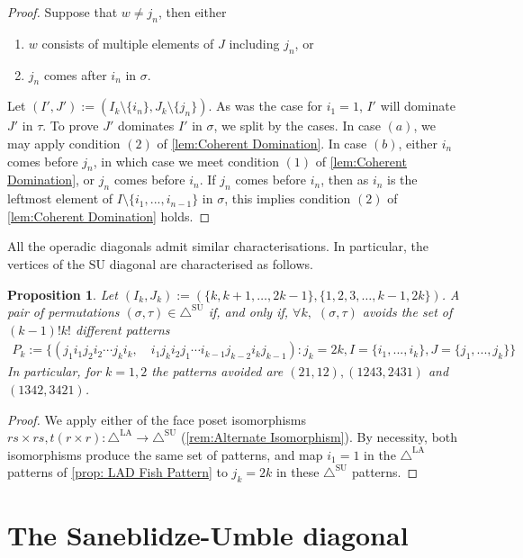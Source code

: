 \documentclass{amsart}
\newtheorem{proposition}[theorem]{Proposition}
\theoremstyle{definition}
\newcommand{\SU}{\mathrm{SU}}
\newcommand{\SUD}{\triangle^{\mathrm{SU}}}
\newcommand{\LAD}{\triangle^{\mathrm{LA}}}
\begin{document}
\begin{proof}
Suppose that $w\neq j_n$, then either
\begin{enumerate}
    \item $w$ consists of multiple elements of $J$ including $j_n$, or
    \item $j_n$ comes after $i_n$ in $\sigma$.
\end{enumerate}
Let $(I',J'):=(I_k\setminus \{i_n\}, J_k \setminus \{j_n\})$.
As was the case for $i_1=1$, $I'$ will dominate $J'$ in $\tau$.
To prove $J'$ dominates $I'$ in $\sigma$, we split by the cases.
In case $(a)$, we may apply condition $(2)$ of \cref{lem:Coherent Domination}.
In case $(b)$, either $i_n$ comes before $j_n$, in which case we meet condition $(1)$ of \cref{lem:Coherent Domination}, or $j_n$ comes before $i_n$.
If $j_n$ comes before $i_n$, then as $i_n$ is the leftmost element of $I\setminus \{i_1,...,i_{n-1} \}$ in $\sigma$, this implies condition $(2)$ of \cref{lem:Coherent Domination} holds.

\end{proof}

All the operadic diagonals admit similar characterisations. 
In particular, the vertices of the $\SU$ diagonal are characterised as follows.

\begin{proposition}\label{prop:SUD Fish Pattern}
Let $(I_k,J_k):= (\{k,k+1,\dots,2k-1\},\{1,2,3,\dots,k-1,2k\})$.
A pair of permutations $(\sigma,\tau)\in \SUD$ if, and only if, $\forall k,$ $(\sigma,\tau)$ avoids the set of $(k-1)!k!$ different patterns
\begin{align*}
    P_k:= \{ (j_1 i_1 j_2 i_2 \cdots j_k i_k,\quad  i_1 j_k i_2 j_1 \cdots i_{k-1} j_{k-2}i_k j_{k-1}): j_k = 2k, I = \{i_1,...,i_k\},J = \{j_1,...,j_k\} \}
\end{align*}
In particular, for $k=1,2$ the patterns avoided are $(21,12), (1243,2431)$ and $(1342, 3421)$.
\end{proposition}
\begin{proof}
We apply either of the face poset isomorphisms $rs \times rs,t(r\times r):\LAD \to \SUD$ (\cref{rem:Alternate Isomorphism}).
By necessity, both isomorphisms produce the same set of patterns, and map $i_1=1$ in the $\LAD$ patterns of \cref{prop: LAD Fish Pattern} to $j_k = 2k$ in these $\SUD$ patterns.
\end{proof}


\section{The Saneblidze-Umble diagonal}
\end{document}
